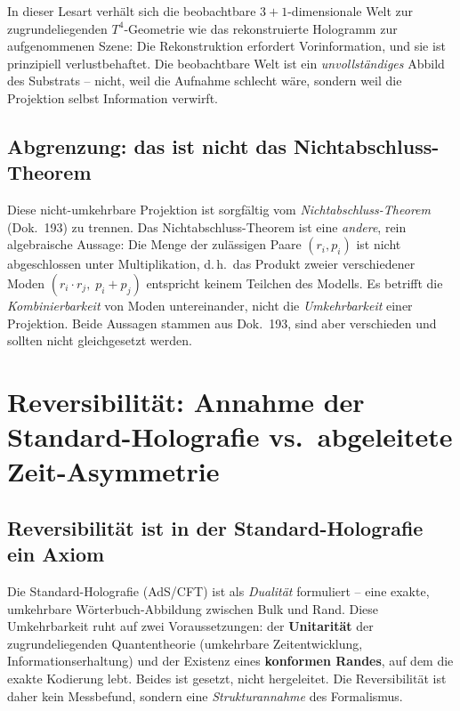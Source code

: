 \medskip

\noindent
In dieser Lesart verhält sich die beobachtbare $3{+}1$-dimensionale Welt zur
zugrundeliegenden $T^4$-Geometrie wie das rekonstruierte Hologramm zur
aufgenommenen Szene: Die Rekonstruktion erfordert Vorinformation, und sie ist
prinzipiell verlustbehaftet. Die beobachtbare Welt ist ein \emph{unvollständiges}
Abbild des Substrats -- nicht, weil die Aufnahme schlecht wäre, sondern weil
die Projektion selbst Information verwirft.

\subsection*{Abgrenzung: das ist nicht das Nichtabschluss-Theorem}

Diese nicht-umkehrbare Projektion ist sorgfältig vom \emph{Nichtabschluss-Theorem}
(Dok.~193) zu trennen. Das Nichtabschluss-Theorem ist eine \emph{andere},
rein algebraische Aussage: Die Menge der zulässigen Paare $(r_i, p_i)$ ist
nicht abgeschlossen unter Multiplikation, d.\,h.\ das Produkt zweier
verschiedener Moden $(r_i\cdot r_j,\; p_i+p_j)$ entspricht keinem Teilchen des
Modells. Es betrifft die \emph{Kombinierbarkeit} von Moden untereinander,
nicht die \emph{Umkehrbarkeit} einer Projektion. Beide Aussagen stammen aus
Dok.~193, sind aber verschieden und sollten nicht gleichgesetzt werden.

\section{Reversibilität: Annahme der Standard-Holografie vs.\ abgeleitete Zeit-Asymmetrie}

\subsection*{Reversibilität ist in der Standard-Holografie ein Axiom}

Die Standard-Holografie (AdS/CFT) ist als \emph{Dualität} formuliert -- eine
exakte, umkehrbare Wörterbuch-Abbildung zwischen Bulk und Rand. Diese
Umkehrbarkeit ruht auf zwei Voraussetzungen: der \textbf{Unitarität} der
zugrundeliegenden Quantentheorie (umkehrbare Zeitentwicklung,
Informationserhaltung) und der Existenz eines \textbf{konformen Randes}, auf
dem die exakte Kodierung lebt. Beides ist gesetzt, nicht hergeleitet. Die
Reversibilität ist daher kein Messbefund, sondern eine \emph{Strukturannahme}
des Formalismus.

